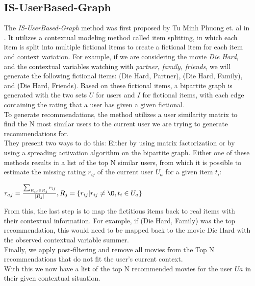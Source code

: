 \subsection{IS-UserBased-Graph}
The \textit{IS-UserBased-Graph} method was first proposed by Tu Minh Phuong et. al in \cite{GraphBasedCollaborativePaper}.
It utilizes a contextual modeling method called item splitting, in which each item is split into multiple fictional items to create a fictional item for each item and context variation.
For example, if we are considering the movie \textit{Die Hard}, and the contextual variables watching with \textit{partner, family, friends}, we will generate the following fictional items: (Die Hard, Partner), (Die Hard, Family), and (Die Hard, Friends).
Based on these fictional items, a bipartite graph is generated with the two sets $U$ for users and $I$ for fictional items, with each edge containing the rating that a user has given a given fictional.\\
To generate recommendations, the method utilizes a user similarity matrix to find the N most similar users to the current user we are trying to generate recommendations for.\\
They present two ways to do this: Either by using matrix factorization or by using a spreading activation algorithm on the bipartite graph.
Either one of these methods results in a list of the top N similar users, from which it is possible to estimate the missing rating $r_{ij}$ of the current user $U_a$ for a given item $t_i$:

$r_{aj} = \frac{\sum_{R_{ij} \in R_j} r_{ij}}{|R_j|}, R_j = \{ r_{ij} | r_{ij} \neq \O , t_i \in U_a \}$

From this, the last step is to map the fictitious items back to real items with their contextual information.
For example, if (Die Hard, Family) was the top recommendation, this would need to be mapped back to the movie Die Hard with the observed contextual variable summer.\\
Finally, we apply post-filtering and remove all movies from the Top N recommendations that do not fit the user's current context.\\
With this we now have a list of the top N recommended movies for the user $Ua$ in their given contextual situation.
